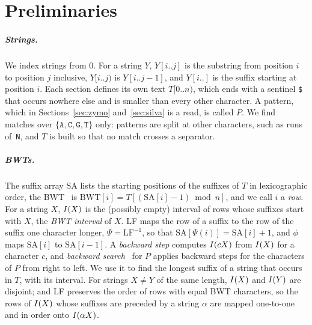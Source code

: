\section{Preliminaries}
\label{sec:prelim}

\subparagraph*{Strings.}
We index strings from $0$.
For a string $Y$, $Y[i..j]$ is the substring from position $i$ to position $j$ inclusive, $Y[i..j)$ is $Y[i..j - 1]$, and $Y[i..]$ is the suffix starting at position $i$.
Each section defines its own text $T[0..n)$, which ends with a sentinel \texttt{\$} that occurs nowhere else and is smaller than every other character.
A pattern, which in Sections~\ref{sec:zymo} and~\ref{sec:silva} is a read, is called $P$.
We find matches over $\{\texttt{A},\texttt{C},\texttt{G},\texttt{T}\}$ only: patterns are split at other characters, such as runs of~\texttt{N}, and $T$ is built so that no match crosses a separator.

\subparagraph*{BWTs.}
The suffix array $\mathrm{SA}$ lists the starting positions of the suffixes of $T$ in lexicographic order, the BWT~\cite{BurrowsWheeler1994} is $\mathrm{BWT}[i] = T[(\mathrm{SA}[i] - 1) \bmod n]$, and we call $i$ a \emph{row}.
For a string $X$, $I(X)$ is the (possibly empty) interval of rows whose suffixes start with $X$, the \emph{BWT interval} of $X$.
LF maps the row of a suffix to the row of the suffix one character longer, $\Psi = \mathrm{LF}^{-1}$, so that $\mathrm{SA}[\Psi(i)] = \mathrm{SA}[i] + 1$, and $\phi$ maps $\mathrm{SA}[i]$ to $\mathrm{SA}[i - 1]$.
A \emph{backward step} computes $I(cX)$ from $I(X)$ for a character $c$, and \emph{backward search}~\cite{FerraginaManzini2000} for $P$ applies backward steps for the characters of $P$ from right to left.
We use it to find the longest suffix of a string that occurs in $T$, with its interval.
For strings $X \ne Y$ of the same length, $I(X)$ and $I(Y)$ are disjoint; and LF preserves the order of rows with equal BWT characters, so the rows of $I(X)$ whose suffixes are preceded by a string $\alpha$ are mapped one-to-one and in order onto $I(\alpha X)$.

